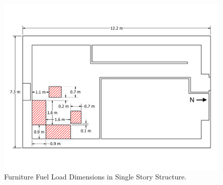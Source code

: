 \documentclass[12pt,oneside]{book}
\begin{document}
\begin{figure}[!ht]
	\includegraphics[width=.8\columnwidth]{../Figures/Floor_Plans/PDFs/East_Structure/DelCo_2012_East_Structure_Furniture}
	\caption{Furniture Fuel Load Dimensions in Single Story Structure.}
	\label{fig:Furniture_Fuel_Load_Dimensions}
\end{figure}
\end{document}
